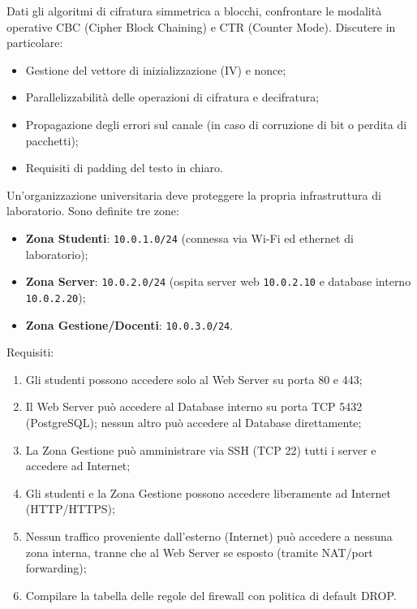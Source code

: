 \documentclass[11pt,a4paper]{article}
\begin{document}
\begin{questionbox}
Dati gli algoritmi di cifratura simmetrica a blocchi, confrontare le modalit\`a operative CBC (Cipher Block Chaining) e CTR (Counter Mode). Discutere in particolare:
\begin{itemize}
    \item Gestione del vettore di inizializzazione (IV) e nonce;
    \item Parallelizzabilit\`a delle operazioni di cifratura e decifratura;
    \item Propagazione degli errori sul canale (in caso di corruzione di bit o perdita di pacchetti);
    \item Requisiti di padding del testo in chiaro.
\end{itemize}
\end{questionbox}

\begin{questionbox}
Un'organizzazione universitaria deve proteggere la propria infrastruttura di laboratorio. Sono definite tre zone:
\begin{itemize}
    \item \textbf{Zona Studenti}: \texttt{10.0.1.0/24} (connessa via Wi-Fi ed ethernet di laboratorio);
    \item \textbf{Zona Server}: \texttt{10.0.2.0/24} (ospita server web \texttt{10.0.2.10} e database interno \texttt{10.0.2.20});
    \item \textbf{Zona Gestione/Docenti}: \texttt{10.0.3.0/24}.
\end{itemize}
Requisiti:
\begin{enumerate}
    \item Gli studenti possono accedere solo al Web Server su porta 80 e 443;
    \item Il Web Server pu\`o accedere al Database interno su porta TCP 5432 (PostgreSQL); nessun altro pu\`o accedere al Database direttamente;
    \item La Zona Gestione pu\`o amministrare via SSH (TCP 22) tutti i server e accedere ad Internet;
    \item Gli studenti e la Zona Gestione possono accedere liberamente ad Internet (HTTP/HTTPS);
    \item Nessun traffico proveniente dall'esterno (Internet) pu\`o accedere a nessuna zona interna, tranne che al Web Server se esposto (tramite NAT/port forwarding);
    \item Compilare la tabella delle regole del firewall con politica di default DROP.
\end{enumerate}
\end{questionbox}
\end{document}
